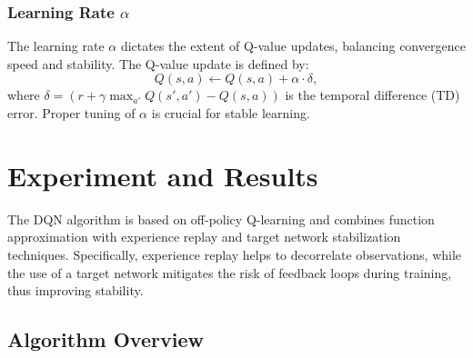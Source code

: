 \documentclass[conference]{IEEEtran}
\begin{document}
\subsubsection{Learning Rate \( \alpha \)}

The learning rate \( \alpha \) dictates the extent of Q-value updates, balancing convergence speed and stability. The Q-value update is defined by:
\begin{equation}
Q(s, a) \leftarrow Q(s, a) + \alpha \cdot \delta,
\end{equation}
where \( \delta = \left( r + \gamma \max_{a'} Q(s', a') - Q(s, a) \right) \) is the temporal difference (TD) error. Proper tuning of \( \alpha \) is crucial for stable learning.





\section{Experiment and Results}
The DQN algorithm is based on off-policy Q-learning and combines function approximation with experience replay and target network stabilization techniques. Specifically, experience replay helps to decorrelate observations, while the use of a target network mitigates the risk of feedback loops during training, thus improving stability.

\subsection{Algorithm Overview}
\end{document}
